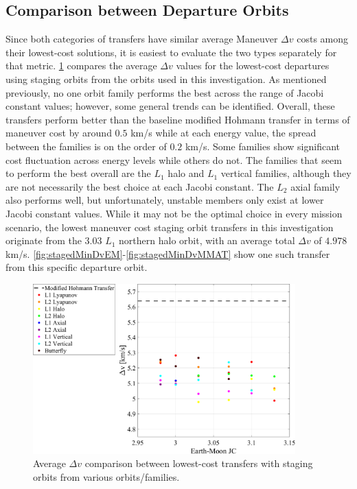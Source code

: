 \subsection{Comparison between Departure Orbits}
Since both categories of transfers have similar average Maneuver $\Delta v$ costs among their
lowest-cost solutions, it is easiest to evaluate the two types separately for that metric.
\cref{fig:compareDeltavStaged} compares the average $\Delta v$ values for the lowest-cost
departures using staging orbits from the orbits used in this investigation. As mentioned
previously, no one orbit family performs the best across the range of Jacobi constant values;
however, some general trends can be identified. Overall, these transfers perform better than the
baseline modified Hohmann transfer in terms of maneuver cost by around $0.5$ km/s while at each
energy value, the spread between the families is on the order of $0.2$ km/s. Some families show
significant cost fluctuation across energy levels while others do not. The families that seem to
perform the best overall are the $L_{1}$ halo and $L_{1}$ vertical families, although they are not
necessarily the best choice at each Jacobi constant. The $L_{2}$ axial family also performs well,
but unfortunately, unstable members only exist at lower Jacobi constant values. While it may not be
the optimal choice in every mission scenario, the lowest maneuver cost staging orbit transfers in
this investigation originate from the $3.03$ $L_{1}$ northern halo orbit, with an average total
$\Delta v$ of $4.978$ km/s. \cref{fig:stagedMinDvEM}-\cref{fig:stagedMinDvMMAT} show one such
transfer from this specific departure orbit.

\begin{figure}[!htb]
    \centering
    \includegraphics[width=0.9\textwidth]{figures/DeltavComparisonStaged.pdf}
    \caption{Average $\Delta v$ comparison between lowest-cost transfers with staging orbits from various orbits/families.}
    \label{fig:compareDeltavStaged}
\end{figure}

